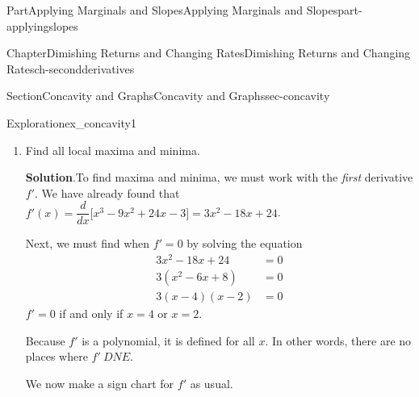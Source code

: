 \documentclass{tufte-book}
\newcommand{\blocktitlefont}{\relax}
\numberwithin{equation}{chapter}
\newcommand{\ddx}[1]{ \dfrac{d}{dx} \Big[ #1 \Big]  }
\newcommand{\amp}{&}
\begin{document}
\begin{partptx}{Part}{Applying Marginals and Slopes}{}{Applying Marginals and Slopes}{}{}{part-applyingslopes}
\begin{chapterptx}{Chapter}{Dimishing Returns and Changing Rates}{}{Dimishing Returns and Changing Rates}{}{}{ch-secondderivatives}
\begin{sectionptx}{Section}{Concavity and Graphs}{}{Concavity and Graphs}{}{}{sec-concavity}
\begin{exploration}{Exploration}{}{ex_concavity1}
\begin{enumerate}[font=\bfseries,label=(\alph*),ref=\alph*]
\begin{image}{0.25}{0.5}{0.25}{}
{
}%
\end{image}%
 Using our graph, we see that the function is concave up on the interval \((3,\infty)\), it is concave down on the interval \((-\infty,3)\), and has a point of inflection at \(x=3\).%
\item{}Find all local maxima and minima.%
\par\smallskip%
\noindent\textbf{\blocktitlefont Solution}.\hypertarget{ex_concavity1-3-2}{}\quad{}To find maxima and minima, we must work with the \emph{first} derivative \(f'\). We have already found that \(f'(x) = \ddx{x^3 - 9x^2 + 24x - 3 } = 3x^2 -18x +24 \).%
\par
Next, we must find when \(f'=0\) by solving the equation%
\begin{align*}
3x^2 - 18x + 24 \amp = 0\\
3(x^2 - 6x +  8) \amp =0\\
3(x - 4)(x - 2) \amp =0
\end{align*}
\(f'=0\) if and only if \(x=4\) or \(x=2\).%
\par
Because \(f'\) is a polynomial, it is defined for all \(x\).  In other words, there are no places where \(f'\ DNE\).%
\par
We now make a sign chart for \(f'\) as usual. \begin{image}{0.25}{0.5}{0.25}{}%
\end{image}
\end{enumerate}
\end{exploration}
\end{sectionptx}
\end{chapterptx}
\end{partptx}
\end{document}
